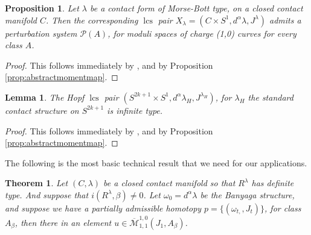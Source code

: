 \documentclass{amsart}
\numberwithin{equation}{section}
\newtheorem{theorem}[equation]{Theorem}
\newtheorem{proposition}[equation]{Proposition}
\newtheorem{lemma}[equation]{Lemma}
\theoremstyle{definition}
\theoremstyle{remark}
\DeclareMathOperator{\lcs}{lcs}
\begin{document}
\begin{proposition} \label{prop:MorseBott1}
  Let  $\lambda$ be a contact form of Morse-Bott type, on a closed contact
  manifold $C$. Then the corresponding $\lcs$ pair $X _{\lambda} =(C \times S ^{1}, d ^{\alpha} \lambda, J ^{\lambda}) $  admits a
  perturbation system $\mathcal{P} (A)$, for moduli spaces of charge (1,0) curves for every class $A$. 
\end{proposition}
\begin{proof}
    This follows immediately by \cite[Proposition 2.12 ]{citeSavelyevFuller}, and by Proposition \ref{prop:abstractmomentmap}.
\end{proof}
\begin{lemma} \label{lemma:HopfinfiniteType} The Hopf $\lcs$ pair $(S ^{2k+1}  \times S ^{1}, d ^{\alpha} \lambda _{H} , J ^{\lambda _{H} })$, for $\lambda _{H} $ the standard contact structure on $S ^{2k+1} $ is infinite type.
\end{lemma}
\begin{proof} This follows immediately by \cite [Lemma 2.13]{citeSavelyevFuller}, and by Proposition \ref{prop:abstractmomentmap}.  \end{proof}

The following is the most basic technical result that we need for our applications.  
\begin{theorem} \label{thm:holomorphicSeifertMain} 
Let $(C,\lambda)
    $ be a closed contact manifold so that $R ^{\lambda} $ has definite type.  And suppose that $i (R ^{\lambda}, \beta ) \neq 0$. Let $\omega _{0} = d ^{\alpha} \lambda   $ be the Banyaga structure, and suppose 
we have a partially admissible homotopy $p = \{(\omega _{t,}, J _{t}  )\}$, for class $A _{\beta} $, then there in an element $u \in \overline{\mathcal{M}} _{1,1} ^{1,0} (J _{1}, A _{\beta} ) $.  
\end{theorem}
\end{document}
